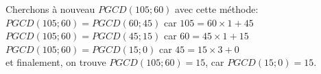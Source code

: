 
Cherchons à nouveau $PGCD(105;60)$ avec cette méthode:\\
$PGCD(105;60)=PGCD(60;45)$ car $105= 60 \times 1 + 45$\\
$PGCD(105;60)=PGCD(45;15)$ car $60=45 \times 1 + 15$\\
$PGCD(105;60)=PGCD(15;0)$ car $45= 15 \times 3 + 0 $\\
et finalement, on trouve $PGCD(105;60)=15$, car $PGCD(15;0)=15$.

